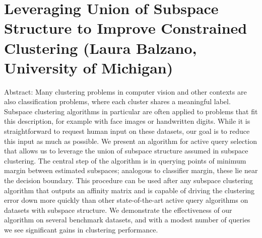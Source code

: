 \section{Leveraging Union of Subspace Structure to Improve Constrained Clustering (Laura Balzano, University of Michigan)}

Abstract: Many clustering problems in computer vision and other contexts are also classification problems, where each cluster shares a meaningful label. Subspace clustering algorithms in particular are often applied to problems that fit this description, for example with face images or handwritten digits. While it is straightforward to request human input on these datasets, our goal is to reduce this input as much as possible. We present an algorithm for active query selection that allows us to leverage the union of subspace structure assumed in subspace clustering. The central step of the algorithm is in querying points of minimum margin between estimated subspaces; analogous to classifier margin, these lie near the decision boundary. This procedure can be used after any subspace clustering algorithm that outputs an affinity matrix and is capable of driving the clustering error down more quickly than other state-of-the-art active query algorithms on datasets with subspace structure. We demonstrate the effectiveness of our algorithm on several benchmark datasets, and with a modest number of queries we see significant gains in clustering performance.